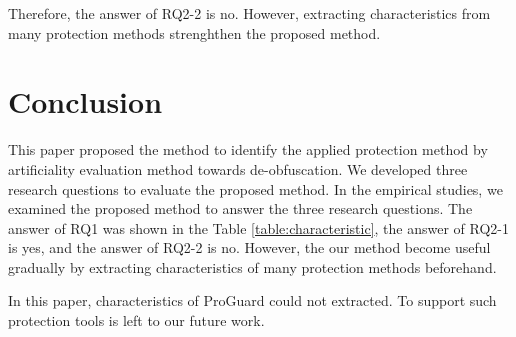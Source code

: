 \documentclass[conference]{IEEEtran}
\begin{document}
Therefore, the answer of RQ2-2 is no. However, extracting
characteristics from many protection methods strenghthen the proposed
method.

% 
% 
% 


\section{Conclusion}\label{sect:conclusion}

This paper proposed the method to identify the applied protection
method by artificiality evaluation method towards de-obfuscation.  We
developed three research questions to evaluate the proposed method.
In the empirical studies, we examined the proposed method to answer
the three research questions.  The answer of RQ1 was shown in the
Table \ref{table:characteristic}, the answer of RQ2-1 is yes, and the
answer of RQ2-2 is no.  However, the our method become useful
gradually by extracting characteristics of many protection methods
beforehand.

In this paper, characteristics of ProGuard could not extracted.
To support such protection tools is left to our future work.






\end{document}
